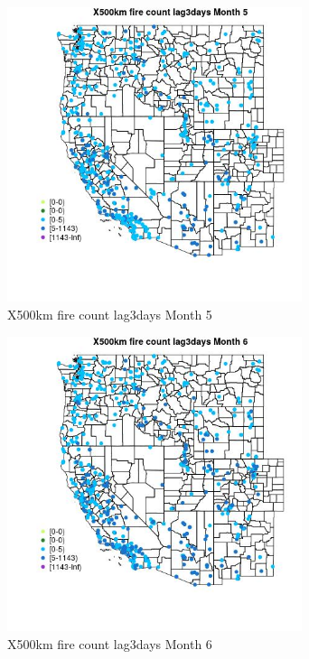 \begin{figure} 
\centering  
\includegraphics[width=0.77\textwidth]{Code_Outputs/Report_ML_input_PM25_Step4_part_e_de_duplicated_aves_compiled_2019-05-14wNAs_MapObsMo5X500km_fire_count_lag3days.jpg} 
\caption{\label{fig:Report_ML_input_PM25_Step4_part_e_de_duplicated_aves_compiled_2019-05-14wNAsMapObsMo5X500km_fire_count_lag3days}X500km fire count lag3days Month 5} 
\end{figure} 
 

\clearpage 

\begin{figure} 
\centering  
\includegraphics[width=0.77\textwidth]{Code_Outputs/Report_ML_input_PM25_Step4_part_e_de_duplicated_aves_compiled_2019-05-14wNAs_MapObsMo6X500km_fire_count_lag3days.jpg} 
\caption{\label{fig:Report_ML_input_PM25_Step4_part_e_de_duplicated_aves_compiled_2019-05-14wNAsMapObsMo6X500km_fire_count_lag3days}X500km fire count lag3days Month 6} 
\end{figure} 
 

